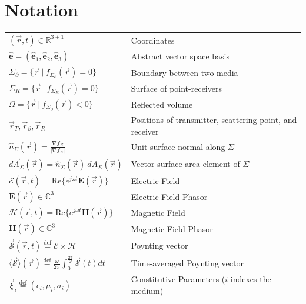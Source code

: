 \documentclass{article}
\begin{document}
\section{Notation}
\begin{center}
\renewcommand{\arraystretch}{1.40}
\begin{tabular}{ m{12em} m{25em} }
   $(\vec{r}, t) \in \mathbb{R}^{3+1}$ & Coordinates \\
   $\mathbf{\hat{e}} = ( \mathbf{\hat{e}}_1, \mathbf{\hat{e}}_2, \mathbf{\hat{e}}_3
      )$ & Abstract vector space basis \\
   $\Sigma_{\partial} = \{ \vec{r} \ | \ f_{\Sigma_{\partial}}(\vec{r}) = 0 \}$ &
      Boundary between two media \\
   $\Sigma_{R} = \{ \vec{r} \ | \ f_{\Sigma_{R}}(\vec{r}) = 0 \}$ &
      Surface of point-receivers \\
   $\Omega = \{ \vec{r} \ | \ f_{\Sigma_{\partial}}(\vec{r}) < 0 \}$ &
      Reflected volume \\
   $\vec{r}_T, \vec{r}_\partial, \vec{r}_R$ & Positions of transmitter, scattering
      point, and receiver \\
   $\hat{n}_{\Sigma}( \vec{r} ) = \frac{\nabla f_{\Sigma}}{|\nabla f_{\Sigma}|}$ &
      Unit surface normal along $\Sigma$ \\
   $d \vec{A}_{\Sigma}( \vec{r} ) = \hat{n}_{\Sigma} ( \vec{r} ) \ dA_{\Sigma} (
      \vec{r} )$ & Vector surface area element of $\Sigma$ \\
   $\mathcal{E}( \vec{r}, t ) = \text{Re} \{ e^{j \omega t} \mathbf{E}( \vec{r} ) \}$
      & Electric Field \\
   $\mathbf{E}( \vec{r} ) \in \mathbb{C}^3$ & Electric Field Phasor \\
   $\mathcal{H}( \vec{r}, t ) = \text{Re} \{ e^{j \omega t} \mathbf{H}( \vec{r} ) \}$
      & Magnetic Field \\
   $\mathbf{H}( \vec{r} ) \in \mathbb{C}^3$ & Magnetic Field Phasor \\
   $\vec{\mathcal{S}}(\vec{r}, t) \overset{\text{def}}{=} \mathcal{E} \times
      \mathcal{H}$ & Poynting vector \\
   $\langle \vec{\mathcal{S}} \rangle (\vec{r}) \overset{\text{def}}{=}
      \frac{\omega}{2 \pi} \int_0^{\frac{2 \pi}{\omega}} \vec{\mathcal{S}}(t) dt$ &
      Time-averaged Poynting vector \\
   $\vec{\xi}_i \overset{\text{def}}{=} ( \epsilon_i, \mu_i, \sigma_i )$ &
      Constitutive Parameters ($i$ indexes the medium) \\

\end{tabular}
\end{center}
\end{document}
